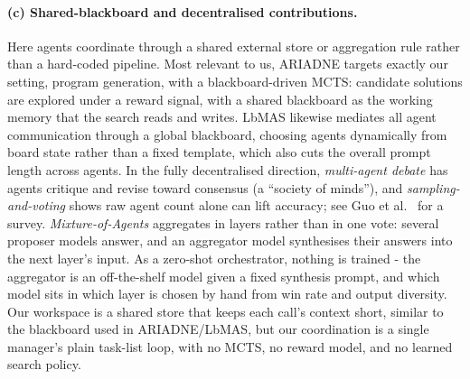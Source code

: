 \documentclass[11pt]{article}
\begin{document}
\paragraph{(c) Shared-blackboard and decentralised contributions.}
Here agents coordinate through a shared external store or aggregation rule rather than a
hard-coded pipeline. Most relevant to us, ARIADNE \cite{wei2026} targets exactly
our setting, program generation, with a
blackboard-driven MCTS: candidate solutions are explored under a reward signal,
with a shared blackboard as the working memory that the search reads and writes.
LbMAS \cite{han2025} likewise mediates all agent
communication through a global blackboard, choosing agents dynamically from board
state rather than a fixed template, which also cuts the overall prompt length across
agents. In the fully
decentralised direction, \textit{multi-agent debate} \cite{du2023} has agents critique
and revise toward consensus (a ``society of minds''), and
\textit{sampling-and-voting} \cite{li2024} shows raw agent count alone can lift accuracy;
see Guo et al.\ \cite{guo2024} for a survey. \textit{Mixture-of-Agents} \cite{wangj2024a}
aggregates in layers rather than in one vote: several proposer models answer, and an
aggregator model synthesises their answers into the next layer's input. As a zero-shot orchestrator,
nothing is trained - the aggregator is an off-the-shelf model given a fixed synthesis prompt, and
which model sits in which layer is chosen by hand from win rate and output diversity.
Our workspace is a shared store that keeps each call's
context short, similar to the blackboard used in ARIADNE/LbMAS, but our coordination is a
single manager's plain task-list loop, with no MCTS, no reward model, and no
learned search policy.
\end{document}
